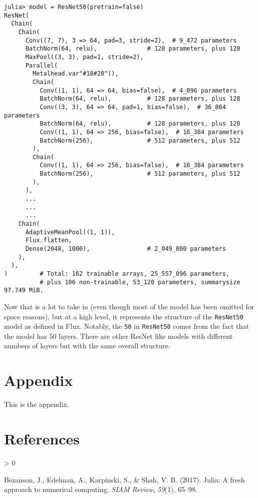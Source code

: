 \documentclass[
  notoc %
]{tufte-book}
\newcommand{\passthrough}[1]{#1}
\newlength{\cslhangindent}
\newenvironment{CSLReferences}[2] %
 {%
  \setlength{\parindent}{0pt}
  \ifodd #1 \everypar{\setlength{\hangindent}{\cslhangindent}}\ignorespaces\fi
  \ifnum #2 > 0
  \setlength{\parskip}{#2\baselineskip}
  \fi
 }%
 {}
\begin{document}
\begin{lstlisting}
julia> model = ResNet50(pretrain=false)
ResNet(
  Chain(
    Chain(
      Conv((7, 7), 3 => 64, pad=3, stride=2),  # 9_472 parameters
      BatchNorm(64, relu),              # 128 parameters, plus 128
      MaxPool((3, 3), pad=1, stride=2),
      Parallel(
        Metalhead.var"#18#20"(),
        Chain(
          Conv((1, 1), 64 => 64, bias=false),  # 4_096 parameters
          BatchNorm(64, relu),          # 128 parameters, plus 128
          Conv((3, 3), 64 => 64, pad=1, bias=false),  # 36_864 parameters
          BatchNorm(64, relu),          # 128 parameters, plus 128
          Conv((1, 1), 64 => 256, bias=false),  # 16_384 parameters
          BatchNorm(256),               # 512 parameters, plus 512
        ),
        Chain(
          Conv((1, 1), 64 => 256, bias=false),  # 16_384 parameters
          BatchNorm(256),               # 512 parameters, plus 512
        ),
      ),
      ...
      ...
      ...
    Chain(
      AdaptiveMeanPool((1, 1)),
      Flux.flatten,
      Dense(2048, 1000),                # 2_049_000 parameters
    ),
  ),
)         # Total: 162 trainable arrays, 25_557_096 parameters,
          # plus 106 non-trainable, 53_120 parameters, summarysize 97.749 MiB.
\end{lstlisting}

Now that is a lot to take in (even though most of the model has been
omitted for space reasons), but at a high level, it represents the
structure of the \passthrough{\lstinline!ResNet50!} model as defined in
Flux. Notably, the \passthrough{\lstinline!50!} in
\passthrough{\lstinline!ResNet50!} comes from the fact that the model
has 50 layers. There are other ResNet like models with different numbers
of layers but with the same overall structure.

\hypertarget{appendix}{%
\chapter*{Appendix}\label{appendix}}

This is the appendix.

\hypertarget{references}{%
\chapter*{References}\label{references}}

\hypertarget{refs}{}
\begin{CSLReferences}{1}{0}
\leavevmode\hypertarget{ref-bezanson2017julia}{}%
Bezanson, J., Edelman, A., Karpinski, S., \& Shah, V. B. (2017). Julia:
A fresh approach to numerical computing. \emph{SIAM Review},
\emph{59}(1), 65--98.

\end{CSLReferences}

\backmatter
\end{document}
